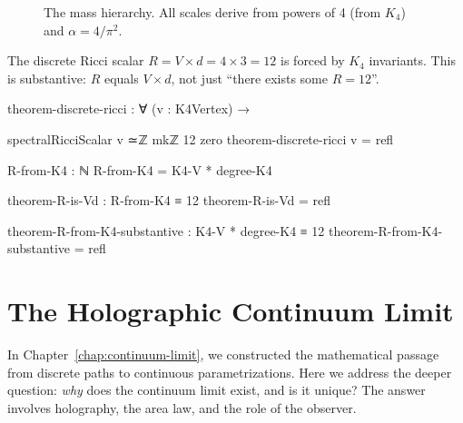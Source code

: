 \documentclass[11pt,a4paper]{book}
\begin{document}
\begin{figure}[h]
\centering
{}
\caption{The mass hierarchy. All scales derive from powers of 4 (from $K_4$) and $\alpha = 4/\pi^2$.}
\label{fig:mass-hierarchy}
\end{figure}

The discrete Ricci scalar $R = V \times d = 4 \times 3 = 12$ is forced by $K_4$ invariants. This is substantive: $R$ equals $V \times d$, not just ``there exists some $R = 12$''.

\begin{code}
theorem-discrete-ricci : ∀ (v : K4Vertex) → 

  spectralRicciScalar v ≃ℤ mkℤ 12 zero
theorem-discrete-ricci v = refl

R-from-K4 : ℕ
R-from-K4 = K4-V * degree-K4

theorem-R-is-Vd : R-from-K4 ≡ 12
theorem-R-is-Vd = refl

theorem-R-from-K4-substantive : K4-V * degree-K4 ≡ 12
theorem-R-from-K4-substantive = refl

\end{code}

\chapter{The Holographic Continuum Limit}
\label{chap:continuum-holographic}

In Chapter~\ref{chap:continuum-limit}, we constructed the mathematical passage from 
discrete paths to continuous parametrizations. Here we address the deeper question: 
\emph{why} does the continuum limit exist, and is it unique? The answer involves 
holography, the area law, and the role of the observer.
\end{document}
